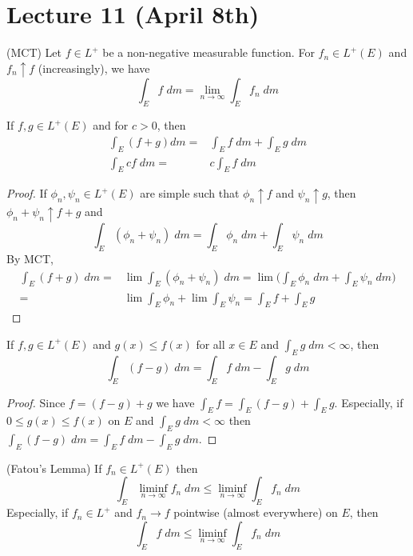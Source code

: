 \section{Lecture 11 (April 8th)}
\begin{thm}
(MCT) Let $f\in L^{+}$ be a non-negative measurable function. For $f_{n}\in L^{+}(E)$ and $f_{n}\uparrow f$ (increasingly), we have
\[\int _{E}f\;dm=\lim _{n\rightarrow \infty }\int _{E}f_{n}\;dm\]
\end{thm}
\vspace{2ex}
\begin{thm}
If $f,g\in L^{+}(E)$ and for $c>0$, then
\begin{align*}
\int _{E}(f+g)d m=&\int _{E}f\;d m+\int _{E}g\;d m\\
\int _{E}cf\;d m=&c\int _{E}f\;d m
\end{align*}
\end{thm}
\vspace{2ex}
\begin{proof}
If $\phi _{n},\psi _{n}\in L^{+}(E)$ are simple such that $\phi _{n}\uparrow f$ and $\psi _{n}\uparrow g$, then $\phi _{n}+\psi _{n}\uparrow f+g$ and
\[\int _{E}(\phi  _{n}+\psi _{n})\;d m=\int _{E}\phi _{n}\;d m+\int _{E}\psi _{n}\;d m\]
By MCT,
\begin{align*}
\int _{E}(f+g)\;d m=&\lim \int _{E}(\phi _{n}+\psi _{n})\;d m=\lim \Big(\int _{E}\phi _{n}\;d m+\int _{E}\psi _{n}\;d m\Big)\\=&\lim \int _{E}\phi _{n}+\lim \int _{E}\psi _{n}=\int _{E}f+\int _{E}g
\end{align*}
\end{proof}
\vspace{2ex}
\begin{thm}
If $f,g\in L^{+}(E)$ and $g(x)\leq f(x)$ for all $x\in E$ and $\int _{E}g\;d m<\infty $, then
\[\int _{E}(f-g)\;d m=\int _{E}f\;d m-\int _{E}g\;d m\]
\end{thm}
\vspace{2ex}
\begin{proof}
Since $f=(f-g)+g$ we have $\int _{E}f=\int _{E}(f-g)+\int _{E}g$. Especially, if $0\leq g(x)\leq f(x)$ on $E$ and $\int _{E}g\;d m<\infty $ then $\int _{E}(f-g)\;d m=\int _{E}f\;d m-\int _{E}g\;d m$. 
\end{proof}
\vspace{2ex}
\begin{lem}
(Fatou's Lemma) If $f_{n}\in L^{+}(E)$ then 
\[\int _{E}\liminf_{n\rightarrow \infty } f_{n}\;dm\leq \liminf_{n\rightarrow \infty }\int _{E}f_{n}\;d m\]
Especially, if $f_{n}\in L^{+}$ and $f_{n}\rightarrow f$ pointwise (almost everywhere) on $E$, then
\[\int _{E}f\;d m\leq \liminf_{n\rightarrow \infty } \int _{E}f_{n}\;d m\]
\end{lem}
